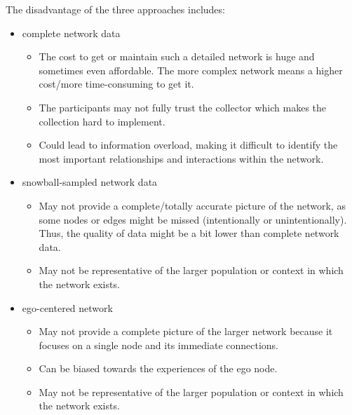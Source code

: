 \documentclass[11pt]{article}
\begin{document}
 The disadvantage of the three approaches includes:
    
    \begin{itemize}
        \item complete network data
            \begin{itemize}
                \item The cost to get or maintain such a detailed network is huge and sometimes even affordable. The more complex network means a higher cost/more time-consuming to get it.
                \item The participants may not fully trust the collector which makes the collection hard to implement.
                \item Could lead to information overload, making it difficult to identify the most important relationships and interactions within the network.
            \end{itemize}
        \item snowball-sampled network data
            \begin{itemize}
                \item May not provide a complete/totally accurate picture of the network, as some nodes or edges might be missed (intentionally or unintentionally). Thus, the quality of data might be a bit lower than complete network data.
                \item May not be representative of the larger population or context in which the network exists.
            \end{itemize}
        \item ego-centered network
            \begin{itemize}
                \item May not provide a complete picture of the larger network because it focuses on a single node and its immediate connections.
                \item Can be biased towards the experiences of the ego node.
                \item May not be representative of the larger population or context in which the network exists. 
            \end{itemize}
    \end{itemize}
    
\end{document}
